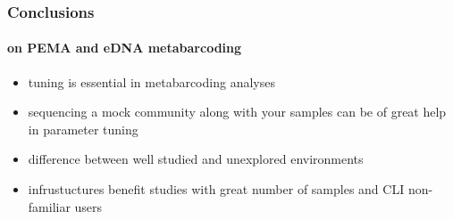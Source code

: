 \documentclass{beamer}
\begin{document}
   \begin{frame}
      \frametitle{Conclusions}
      \framesubtitle{on PEMA and eDNA metabarcoding}

      \begin{itemize}
         \item tuning is essential in metabarcoding analyses
         \item sequencing a mock community along with your samples can be of great help in parameter tuning 
         \item difference between well studied and unexplored environments
         \item infrustuctures benefit studies with great number of samples and CLI non-familiar users
      \end{itemize}


   \end{frame}

\end{document}
